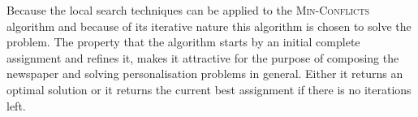 Because the local search techniques can be applied to the \textsc{Min-Conflicts} algorithm and because of its iterative nature this algorithm is chosen to solve the problem. The property that the algorithm starts by an initial complete assignment and refines it, makes it attractive for the purpose of composing the newspaper and solving personalisation problems in general. Either it returns an optimal solution or it returns the current best assignment if there is no iterations left.

%
%
%
%
%
%
